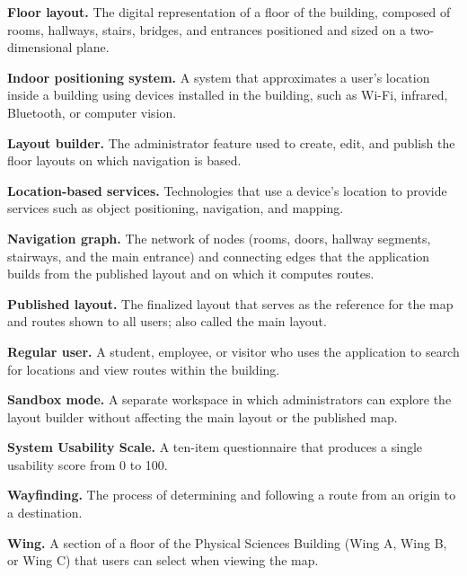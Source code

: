 \textbf{Floor layout.} The digital representation of a floor of the building,
composed of rooms, hallways, stairs, bridges, and entrances positioned and sized
on a two-dimensional plane.

\textbf{Indoor positioning system.} A system that approximates a user's location
inside a building using devices installed in the building, such as Wi-Fi,
infrared, Bluetooth, or computer vision.

\textbf{Layout builder.} The administrator feature used to create, edit, and
publish the floor layouts on which navigation is based.

\textbf{Location-based services.} Technologies that use a device's location to
provide services such as object positioning, navigation, and mapping.

\textbf{Navigation graph.} The network of nodes (rooms, doors, hallway segments,
stairways, and the main entrance) and connecting edges that the application
builds from the published layout and on which it computes routes.

\textbf{Published layout.} The finalized layout that serves as the reference for
the map and routes shown to all users; also called the main layout.

\textbf{Regular user.} A student, employee, or visitor who uses the application
to search for locations and view routes within the building.

\textbf{Sandbox mode.} A separate workspace in which administrators can explore
the layout builder without affecting the main layout or the published map.

\textbf{System Usability Scale.} A ten-item questionnaire that produces a single
usability score from 0 to 100.

\textbf{Wayfinding.} The process of determining and following a route from an
origin to a destination.

\textbf{Wing.} A section of a floor of the Physical Sciences Building (Wing A,
Wing B, or Wing C) that users can select when viewing the map.
